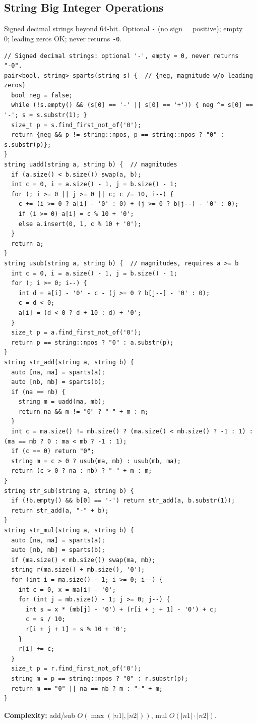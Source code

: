 \subsection{String Big Integer Operations}
Signed decimal strings beyond 64-bit. Optional \texttt{-} (no sign = positive); empty = 0; leading zeros OK; never returns \texttt{-0}.
\begin{verbatim}
// Signed decimal strings: optional '-', empty = 0, never returns "-0".
pair<bool, string> sparts(string s) {  // {neg, magnitude w/o leading zeros}
  bool neg = false;
  while (!s.empty() && (s[0] == '-' || s[0] == '+')) { neg ^= s[0] == '-'; s = s.substr(1); }
  size_t p = s.find_first_not_of('0');
  return {neg && p != string::npos, p == string::npos ? "0" : s.substr(p)};
}
string uadd(string a, string b) {  // magnitudes
  if (a.size() < b.size()) swap(a, b);
  int c = 0, i = a.size() - 1, j = b.size() - 1;
  for (; i >= 0 || j >= 0 || c; c /= 10, i--) {
    c += (i >= 0 ? a[i] - '0' : 0) + (j >= 0 ? b[j--] - '0' : 0);
    if (i >= 0) a[i] = c % 10 + '0';
    else a.insert(0, 1, c % 10 + '0');
  }
  return a;
}
string usub(string a, string b) {  // magnitudes, requires a >= b
  int c = 0, i = a.size() - 1, j = b.size() - 1;
  for (; i >= 0; i--) {
    int d = a[i] - '0' - c - (j >= 0 ? b[j--] - '0' : 0);
    c = d < 0;
    a[i] = (d < 0 ? d + 10 : d) + '0';
  }
  size_t p = a.find_first_not_of('0');
  return p == string::npos ? "0" : a.substr(p);
}
string str_add(string a, string b) {
  auto [na, ma] = sparts(a);
  auto [nb, mb] = sparts(b);
  if (na == nb) {
    string m = uadd(ma, mb);
    return na && m != "0" ? "-" + m : m;
  }
  int c = ma.size() != mb.size() ? (ma.size() < mb.size() ? -1 : 1) : (ma == mb ? 0 : ma < mb ? -1 : 1);
  if (c == 0) return "0";
  string m = c > 0 ? usub(ma, mb) : usub(mb, ma);
  return (c > 0 ? na : nb) ? "-" + m : m;
}
string str_sub(string a, string b) {
  if (!b.empty() && b[0] == '-') return str_add(a, b.substr(1));
  return str_add(a, "-" + b);
}
string str_mul(string a, string b) {
  auto [na, ma] = sparts(a);
  auto [nb, mb] = sparts(b);
  if (ma.size() < mb.size()) swap(ma, mb);
  string r(ma.size() + mb.size(), '0');
  for (int i = ma.size() - 1; i >= 0; i--) {
    int c = 0, x = ma[i] - '0';
    for (int j = mb.size() - 1; j >= 0; j--) {
      int s = x * (mb[j] - '0') + (r[i + j + 1] - '0') + c;
      c = s / 10;
      r[i + j + 1] = s % 10 + '0';
    }
    r[i] += c;
  }
  size_t p = r.find_first_not_of('0');
  string m = p == string::npos ? "0" : r.substr(p);
  return m == "0" || na == nb ? m : "-" + m;
}
\end{verbatim}
\textbf{Complexity:} add/sub $O(\max(|n1|,|n2|))$, mul $O(|n1|\cdot|n2|)$.